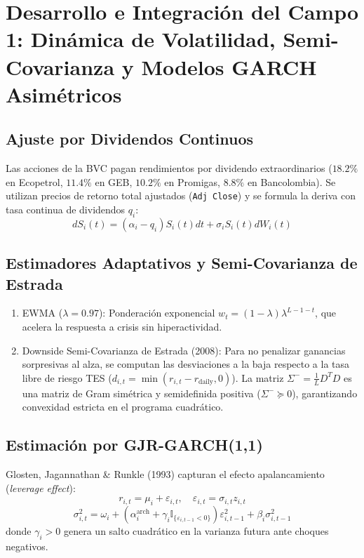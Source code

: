 \documentclass[11pt,a4paper]{article}
\begin{document}
\section{Desarrollo e Integración del Campo 1: Dinámica de Volatilidad, Semi-Covarianza y Modelos GARCH Asimétricos}

\subsection{Ajuste por Dividendos Continuos}
Las acciones de la BVC pagan rendimientos por dividendo extraordinarios ($18.2\%$ en Ecopetrol, $11.4\%$ en GEB, $10.2\%$ en Promigas, $8.8\%$ en Bancolombia). Se utilizan precios de retorno total ajustados (\texttt{Adj Close}) y se formula la deriva con tasa continua de dividendos $q_i$:
\begin{equation}
    dS_i(t) = (\alpha_i - q_i) S_i(t) dt + \sigma_i S_i(t) dW_i(t)
\end{equation}

\subsection{Estimadores Adaptativos y Semi-Covarianza de Estrada}
\begin{enumerate}
    \item EWMA ($\lambda = 0.97$): Ponderación exponencial $w_t = (1-\lambda)\lambda^{L-1-t}$, que acelera la respuesta a crisis sin hiperactividad.
    \item Downside Semi-Covarianza de Estrada (2008): Para no penalizar ganancias sorpresivas al alza, se computan las desviaciones a la baja respecto a la tasa libre de riesgo TES ($d_{i,t} = \min(r_{i,t} - r_{\mathrm{daily}}, 0)$). La matriz $\Sigma^- = \frac{1}{L} D^T D$ es una matriz de Gram simétrica y semidefinida positiva ($\Sigma^- \succeq 0$), garantizando convexidad estricta en el programa cuadrático.
\end{enumerate}

\subsection{Estimación por GJR-GARCH(1,1)}
Glosten, Jagannathan \& Runkle (1993) capturan el efecto apalancamiento (\emph{leverage effect}):
\begin{equation}
    r_{i,t} = \mu_i + \varepsilon_{i,t}, \quad \varepsilon_{i,t} = \sigma_{i,t} z_{i,t}
\end{equation}
\begin{equation}
    \sigma_{i,t}^2 = \omega_i + \left(\alpha_i^{\mathrm{arch}} + \gamma_i \mathbb{I}_{\{\varepsilon_{i,t-1} < 0\}}\right) \varepsilon_{i,t-1}^2 + \beta_i \sigma_{i,t-1}^2
\end{equation}
donde $\gamma_i > 0$ genera un salto cuadrático en la varianza futura ante choques negativos.
\end{document}
